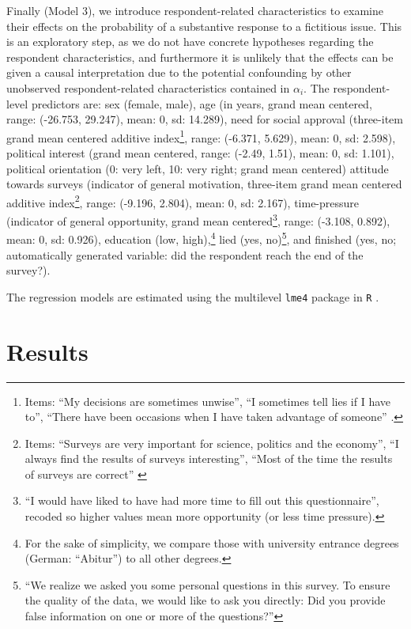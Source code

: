 \documentclass[Royal,times,sageh]{sagej}
\begin{document}
Finally (Model 3), we introduce respondent-related characteristics to
examine their effects on the probability of a substantive response to a
fictitious issue. This is an exploratory step, as we do not have
concrete hypotheses regarding the respondent characteristics, and
furthermore it is unlikely that the effects can be given a causal
interpretation due to the potential confounding by other unobserved
respondent-related characteristics contained in \(\alpha_{i}\). The
respondent-level predictors are: sex (female, male), age (in years,
grand mean centered, range: (-26.753, 29.247), mean: 0, sd: 14.289),
need for social approval (three-item grand mean centered additive
index\footnote{Items: ``My decisions are sometimes unwise'', ``I
  sometimes tell lies if I have to'', ``There have been occasions when I
  have taken advantage of someone''
  \citep{Paulhus1984, Paulhus1988, Hart2015, Blasberg2013}.}, range:
(-6.371, 5.629), mean: 0, sd: 2.598), political interest (grand mean
centered, range: (-2.49, 1.51), mean: 0, sd: 1.101), political
orientation (0: very left, 10: very right; grand mean centered) attitude
towards surveys (indicator of general motivation, three-item grand mean
centered additive index\footnote{Items: ``Surveys are very important for
  science, politics and the economy'', ``I always find the results of
  surveys interesting'', ``Most of the time the results of surveys are
  correct'' \citep{Stocke2006, Stocke2014}}, range: (-9.196, 2.804),
mean: 0, sd: 2.167), time-pressure (indicator of general opportunity,
grand mean centered\footnote{``I would have liked to have had more time
  to fill out this questionnaire'', recoded so higher values mean more
  opportunity (or less time pressure).}, range: (-3.108, 0.892), mean:
0, sd: 0.926), education (low, high),\footnote{For the sake of
  simplicity, we compare those with university entrance degrees (German:
  ``Abitur'') to all other degrees.} lied (yes, no)\footnote{``We
  realize we asked you some personal questions in this survey. To ensure
  the quality of the data, we would like to ask you directly: Did you
  provide false information on one or more of the questions?''}, and
finished (yes, no; automatically generated variable: did the respondent
reach the end of the survey?).

The regression models are estimated using the multilevel \texttt{lme4}
\citep{R-lme4} package in \texttt{R} \citep{R-base}.

\hypertarget{results}{%
\section{Results}\label{results}}
\end{document}
